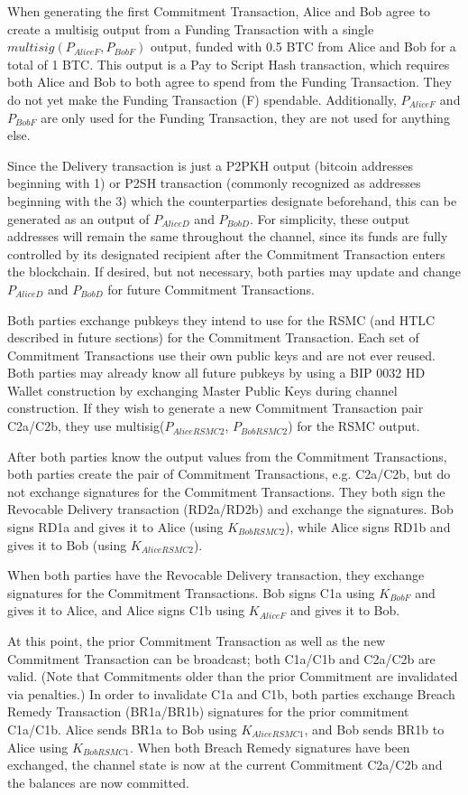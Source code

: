 \documentclass[letterpaper,11pt]{article}
\begin{document}
When generating the first Commitment Transaction, Alice and Bob agree to create
a multisig output from a Funding Transaction with a single $multisig(P_{AliceF},
P_{BobF})$ output, funded with 0.5 BTC from Alice and Bob for a total of 1 BTC.
This output is a Pay to Script Hash\cite{p2sh} transaction, which requires both
Alice and Bob to both agree to spend from the Funding Transaction. They do not
yet make the Funding Transaction (F) spendable. Additionally, $P_{AliceF}$ and
$P_{BobF}$ are only used for the Funding Transaction, they are not used for
anything else.

Since the Delivery transaction is just a P2PKH output (bitcoin addresses
beginning with 1) or P2SH transaction (commonly recognized as addresses
beginning with the 3) which the counterparties designate beforehand, this can be
generated as an output of $P_{AliceD}$ and $P_{BobD}$. For simplicity, these
output addresses will remain the same throughout the channel, since its funds
are fully controlled by its designated recipient after the Commitment
Transaction enters the blockchain. If desired, but not necessary, both parties
may update and change $P_{AliceD}$ and $P_{BobD}$ for future Commitment
Transactions.

Both parties exchange pubkeys they intend to use for the RSMC (and HTLC
described in future sections) for the Commitment Transaction. Each set of
Commitment Transactions use their own public keys and are not ever reused. Both
parties may already know all future pubkeys by using a BIP 0032\cite{bip32} HD
Wallet construction by exchanging Master Public Keys during channel
construction. If they wish to generate a new Commitment Transaction pair
C2a/C2b, they use multisig($P_{AliceRSMC2}$, $P_{BobRSMC2}$) for the RSMC
output.

After both parties know the output values from the Commitment Transactions, both
parties create the pair of Commitment Transactions, e.g. C2a/C2b, but do not
exchange signatures for the Commitment Transactions. They both sign the
Revocable Delivery transaction (RD2a/RD2b) and exchange the signatures. Bob
signs RD1a and gives it to Alice (using $K_{BobRSMC2}$), while Alice signs RD1b
and gives it to Bob (using $K_{AliceRSMC2}$).

When both parties have the Revocable Delivery transaction, they exchange
signatures for the Commitment Transactions. Bob signs C1a using $K_{BobF}$ and
gives it to Alice, and Alice signs C1b using $K_{AliceF}$ and gives it to Bob.

At this point, the prior Commitment Transaction as well as the new Commitment
Transaction can be broadcast; both C1a/C1b and C2a/C2b are valid. (Note that
Commitments older than the prior Commitment are invalidated via penalties.) In
order to invalidate C1a and C1b, both parties exchange Breach Remedy Transaction
(BR1a/BR1b) signatures for the prior commitment C1a/C1b. Alice sends BR1a to Bob
using $K_{AliceRSMC1}$, and Bob sends BR1b to Alice using $K_{BobRSMC1}$. When
both Breach Remedy signatures have been exchanged, the channel state is now at
the current Commitment C2a/C2b and the balances are now committed.
\end{document}

